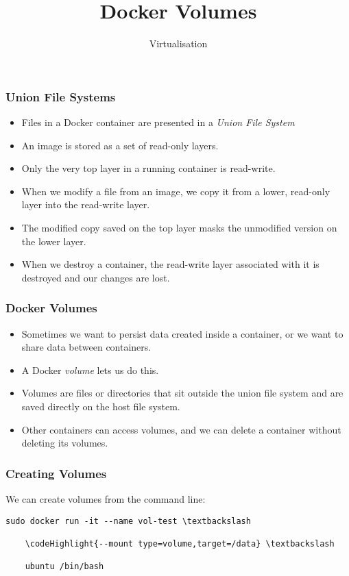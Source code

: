 \documentclass[10pt]{beamer}
\title{Docker Volumes}
\author[IN720]{Virtualisation}
\institute[Otago Polytechnic]{
  Otago Polytechnic \\
  Dunedin, New Zealand \\
}
\date{}
\newcommand\codeHighlight[1]{\textcolor[rgb]{1,0,0}{\textbf{#1}}}
\begin{document}
\begin{frame}[plain]
  \titlepage
\end{frame}


\begin{frame}
  \frametitle{Union File Systems}

 \begin{itemize}
  \item Files in a Docker container are presented in a \emph{Union File System}
  \item An image is stored as a set of read-only layers. 
  \item Only the very top layer in a running container is read-write.
  \item When we modify a file from an image, we copy it from a lower, read-only layer into the read-write layer.
  \item The modified copy saved on the top layer masks the unmodified version on the lower layer.
  \item When we destroy a container, the read-write layer associated with it is destroyed and our changes are lost.
  
  \end{itemize}
\end{frame}

\begin{frame}
	\frametitle{Docker Volumes}
	\begin{itemize}
		\item Sometimes we want to persist data created inside a container, or we want to share data between containers.
		\item A Docker \emph{volume} lets us do this.
		\item Volumes are files or directories that sit outside the union file system and are saved directly on the host file system.
		\item Other containers can access volumes, and we can delete a container without deleting its volumes.
	\end{itemize}
\end{frame}

\begin{frame}[fragile]
	\frametitle{Creating Volumes}
	We can create volumes from the command line:
	
	\begin{Verbatim}[commandchars=\\\{\}]
	sudo docker run -it --name vol-test \textbackslash
	
	\codeHighlight{--mount type=volume,target=/data} \textbackslash
	
	ubuntu /bin/bash
	\end{Verbatim}
\end{frame}
\end{document}
